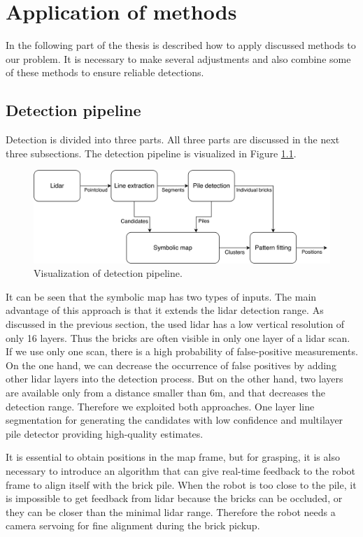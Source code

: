\chapter{Application of methods}
\label{ch:applications}
In the following part of the thesis is described how to apply discussed methods to our problem. It is necessary to make several adjustments and also combine some of these methods to ensure reliable detections.

\section{Detection pipeline}
Detection is divided into three parts. All three parts are discussed in the next three subsections. The detection pipeline is visualized in Figure \ref{fig:flowchart}. 

\hspace{5px}
\begin{figure}[H]
\centering
\includegraphics[scale=0.06]{fig/flowchart.pdf}
\caption[Program pipeline]{Visualization of detection pipeline.}
\label{fig:flowchart}
\end{figure}

It can be seen that the symbolic map has two types of inputs. The main advantage of this approach is that it extends the lidar detection range. As discussed in the previous section, the used lidar has a low vertical resolution of only 16 layers. Thus the bricks are often visible in only one layer of a lidar scan. If we use only one scan, there is a high probability of false-positive measurements. On the one hand, we can decrease the occurrence of false positives by adding other lidar layers into the detection process. But on the other hand, two layers are available only from a distance smaller than $6$m, and that decreases the detection range. Therefore we exploited both approaches. One layer line segmentation for generating the candidates with low confidence and multilayer pile detector providing high-quality estimates. 

It is essential to obtain positions in the map frame, but for grasping, it is also necessary to introduce an algorithm that can give real-time feedback to the robot frame to align itself with the brick pile. When the robot is too close to the pile, it is impossible to get feedback from lidar because the bricks can be occluded, or they can be closer than the minimal lidar range. Therefore the robot needs a camera servoing for fine alignment during the brick pickup.

